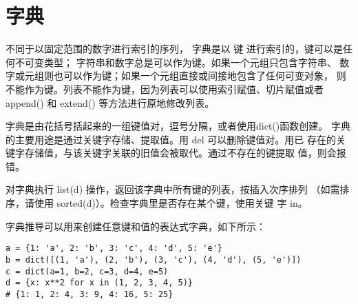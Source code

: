 \documentclass[a4paper, 12pt]{article}
\begin{document}
    \section{字典}
        不同于以固定范围的数字进行索引的序列，
        字典是以 键 进行索引的，键可以是任何不可变类型；
        字符串和数字总是可以作为键。如果一个元组只包含字符串、
        数字或元组则也可以作为键；如果一个元组直接或间接地包含了任何可变对象，
        则不能作为键。列表不能作为键，因为列表可以使用索引赋值、切片赋值或者 
        append() 和 extend() 等方法进行原地修改列表。\par
        字典是由花括号括起来的一组键值对，逗号分隔，或者使用dict()函数创建。
        字典的主要用途是通过关键字存储、提取值。用 del 可以删除键值对。用已
        存在的关键字存储值，与该关键字关联的旧值会被取代。通过不存在的键提取
        值，则会报错。\par
        对字典执行 list(d) 操作，返回该字典中所有键的列表，按插入次序排列
        （如需排序，请使用 sorted(d)）。检查字典里是否存在某个键，使用关键
        字 in。\par
        字典推导可以用来创建任意键和值的表达式字典，如下所示：\par
        \begin{listing}[h!]
            \begin{verbatim}
a = {1: 'a', 2: 'b', 3: 'c', 4: 'd', 5: 'e'}
b = dict([(1, 'a'), (2, 'b'), (3, 'c'), (4, 'd'), (5, 'e')])
c = dict(a=1, b=2, c=3, d=4, e=5)
d = {x: x**2 for x in (1, 2, 3, 4, 5)}
# {1: 1, 2: 4, 3: 9, 4: 16, 5: 25}
            \end{verbatim}
        \end{listing}
\end{document}
